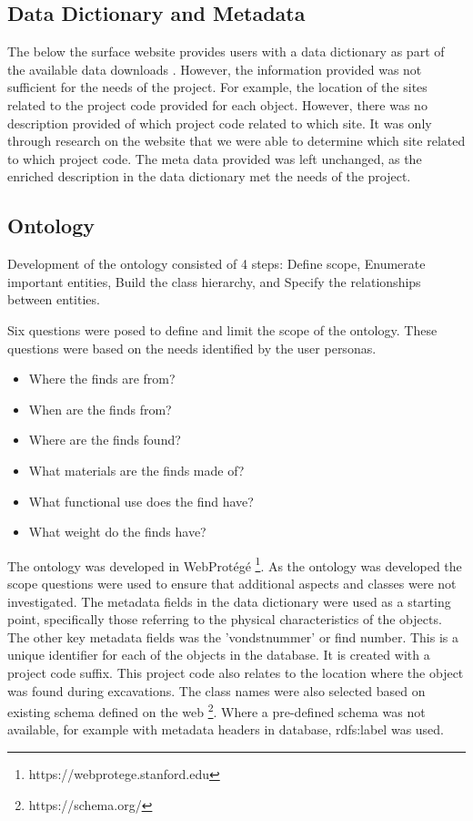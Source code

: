 \subsection{Data Dictionary and Metadata}

The below the surface website provides users with a data dictionary as part of the available data downloads \cite{BelowAmsterdam}.  However, the information provided was not sufficient for the needs of the project.  For example, the location of the sites related to the project code provided for each object.  However, there was no description provided of which project code related to which site.  It was only through research on the website that we were able to determine which site related to which project code.  The meta data provided was left unchanged, as the enriched description in the data dictionary met the needs of the project.

\subsection{Ontology} 
Development of the ontology consisted of 4 steps: Define scope, Enumerate important entities, Build the class hierarchy, and Specify the relationships between entities.

Six questions were posed to define and limit the scope of the ontology.  These questions were based on the needs identified by the user personas.
\begin{itemize}
    \item Where the finds are from?
    \item When are the finds from?
    \item Where are the finds found?
    \item What materials are the finds made of?
    \item What functional use does the find have?
    \item What weight do the finds have?
\end{itemize}

The ontology was developed in WebProtégé \footnote{https://webprotege.stanford.edu}.  As the ontology was developed the scope questions were used to ensure that additional aspects and classes were not investigated. The metadata fields in the data dictionary were used as a starting point, specifically those referring to the physical characteristics of the objects.  The other key metadata fields was the 'vondstnummer' or find number.  This is a unique identifier for each of the objects in the database.  It is created with a project code suffix.  This project code also relates to the location where the object was found during excavations.  The class names were also selected based on existing schema defined on the web \footnote{https://schema.org/}.  Where a pre-defined schema was not available, for example with metadata headers in database, rdfs:label was used.     

